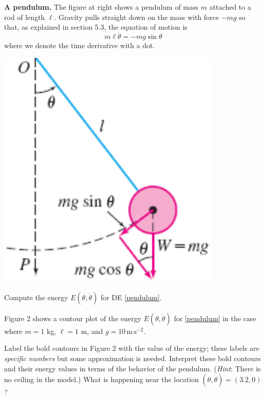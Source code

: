 \documentclass[12pt]{article}
\theoremstyle{definition}
\begin{document}
\medskip
\begin{minipage}[t]{0.65\textwidth}
\textbf{A pendulum.}  The figure at right shows a pendulum of mass $m$ attached to a rod of length $\ell$.  Gravity pulls straight down on the mass with force $-mg$ so that, as explained in section 5.3, the equation of motion is
\begin{equation}
m \ell \ddot{\theta} = -m g \sin\theta  \label{pendulum}
\end{equation}
where we denote the time derivative with a dot.

\end{minipage}
\begin{minipage}[t]{0.35\textwidth}
\vspace{0pt}

\hfill \includegraphics[width=0.8\textwidth]{pendulum}
\end{minipage}

\begin{exerpart}
Compute the energy $E(\theta,\dot\theta)$ for DE \eqref{pendulum}.
\end{exerpart}

Figure 2 shows a contour plot of the energy $E(\theta,\dot\theta)$ for \eqref{pendulum} in the case where $m=1$ kg, $\ell=1$ m, and $g=10 \, \text{m}\,\text{s}^{-2}$. 

\begin{exerpart}
Label the bold contours in Figure 2 with the value of the energy; these labels are \emph{specific numbers} but some approximation is needed.  Interpret these bold contours and their energy values in terms of the behavior of the pendulum.  (\emph{Hint}:  There is no ceiling in the model.)  What is happening near the location $(\theta,\dot\theta)=(3.2,0)$?
\end{exerpart}
\end{document}
